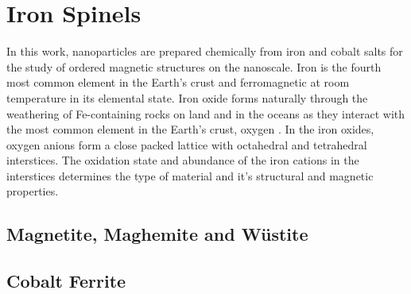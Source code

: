 \documentclass[\main/dresen_thesis.tex]{subfiles}
\renewcommand{\thisPath}{\main/chapters/theoreticalBackground/ferrites}
\begin{document}
  \section{Iron Spinels}
    In this work, nanoparticles are prepared chemically from iron and cobalt salts for the study of ordered magnetic structures on the nanoscale.
    Iron is the fourth most common element in the Earth's crust and ferromagnetic at room temperature in its elemental state.
    Iron oxide forms naturally through the weathering of Fe-containing rocks on land and in the oceans as they interact with the most common element in the Earth's crust, oxygen \cite{Parkinson_2016_Irono}.
    In the iron oxides, oxygen anions  form a close packed lattice with octahedral and tetrahedral interstices.
    The oxidation state and abundance of the iron cations in the interstices determines the type of material and it's structural and magnetic properties.

    \subsection{Magnetite, Maghemite and W\"ustite}\label{ch:theoreticalBackground:maghemite}
      

    \subsection{Cobalt Ferrite}\label{ch:theoreticalBackground:cobaltferrite}
      
\end{document}
